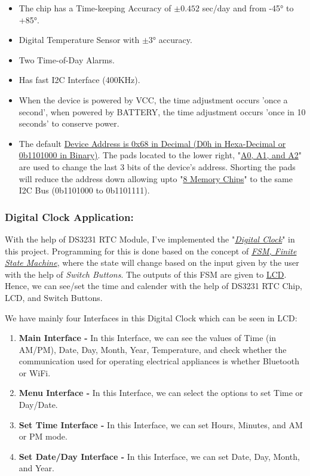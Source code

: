 \documentclass[11pt,a4paper]{article}
\begin{document}
\begin{itemize}
\item The chip has a Time-keeping Accuracy of $\pm{0.452}$ sec/day and from -45\si{\degree} to +85\si{\degree}.

\item Digital Temperature Sensor with $\pm{3}$\si{\degree} accuracy.

\item Two Time-of-Day Alarms.

\item Has fast I2C Interface (400KHz).

\item When the device is powered by VCC, the time adjustment occurs 'once a second', when powered by BATTERY, the time adjustment occurs 'once in 10 seconds' to conserve power.  

\item The default \uline{Device Address is 0x68 in Decimal (D0h in Hexa-Decimal or 0b1101000 in Binary)}. The pads located to the lower right, "\uline{A0, A1, and A2}" are used to change the last 3 bits of the device's address. Shorting the pads will reduce the address down allowing upto "\uline{8 Memory Chips}" to the same I2C Bus (0b1101000 to 0b1101111).

\end{itemize}

\subsubsection{Digital Clock Application:}

With the help of DS3231 RTC Module, I've implemented the "\uline{\textit{Digital Clock}}" in this project. Programming for this is done based on the concept of \uline{\textit{FSM, Finite State Machine}}, where the state will change based on the input given by the user with the help of \textit{Switch Buttons}. The outputs of this FSM are given to \uline{LCD}. Hence, we can see/set the time and calender with the help of DS3231 RTC Chip, LCD, and Switch Buttons. 

We have mainly four Interfaces in this Digital Clock which can be seen in LCD:

\begin{enumerate}
\item \textbf{Main Interface -} In this Interface, we can see the values of Time (in AM/PM), Date, Day, Month, Year, Temperature, and check whether the communication used for operating electrical appliances is whether Bluetooth or WiFi.

\item \textbf{Menu Interface -} In this Interface, we can select the options to set Time or Day/Date.

\item \textbf{Set Time Interface -} In this Interface, we can set Hours, Minutes, and AM or PM mode.

\item \textbf{Set Date/Day Interface -} In this Interface, we can set Date, Day, Month, and Year.
\end{enumerate}
\end{document}
